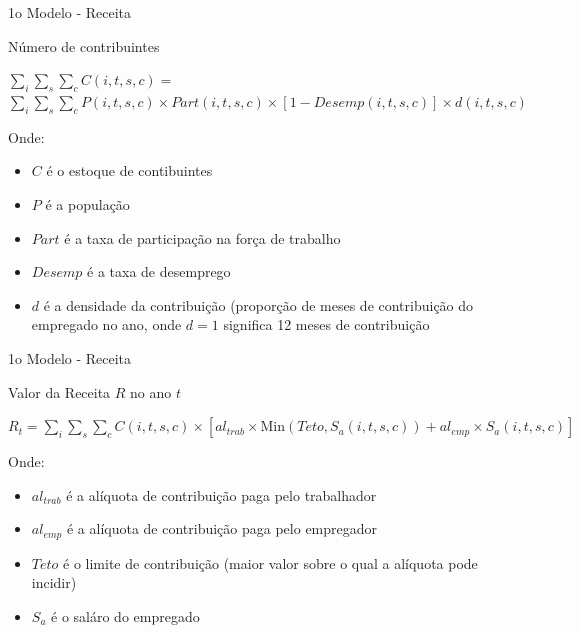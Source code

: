 \begin{frame}{1o Modelo - Receita}
  \begin{block}{Número de contribuintes}
  \scriptsize
      \begin{center}
      $\sum_i \sum_s \sum_c C(i,t,s,c) =$ \\
       $\sum_i \sum_s \sum_c P(i,t,s,c) \times Part(i,t,s,c) \times [1-Desemp(i,t,s,c)] \times d(i,t,s,c)$
      \end{center}
  \end{block}
  \scriptsize
    Onde:
    \begin{itemize}
      \item $C$ é o estoque de contibuintes
      \item $P$ é a população
      \item $Part$ é a taxa de participação na força de trabalho
      \item $Desemp$ é a taxa de desemprego
      \item $d$ é a densidade da contribuição (proporção de meses de contribuição do empregado no ano, onde $d=1$ significa 12 meses de contribuição
    \end{itemize}
\end{frame}

\begin{frame}{1o Modelo - Receita}
  \begin{block}{Valor da Receita $R$ no ano $t$}
  \scriptsize
      \begin{center}
    $R_t = \sum_i \sum_s \sum_c C(i,t,s,c) \times [al_{trab} \times \text{Min}(Teto, S_a(i,t,s,c)) + al_{emp} \times S_a(i,t,s,c)]$
      \end{center}
  \end{block}
  \scriptsize
    Onde:
    \begin{itemize}
      \item $al_{trab}$ é a alíquota de contribuição paga pelo trabalhador
      \item $al_{emp}$ é a alíquota de contribuição paga pelo empregador
      \item $Teto$ é o limite de contribuição (maior valor sobre o qual a alíquota pode incidir)
      \item $S_a$ é o saláro do empregado
    \end{itemize}
\end{frame}


